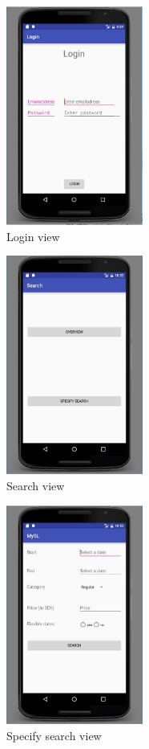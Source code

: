 \documentclass[11pt,twoside,a4paper]{report}
\begin{document}
\begin{appendices}
\begin{figure}
	\centering
	\includegraphics[width=0.4\textwidth]{png/android-login.png}
	\caption{Login view}
	\label{figure:navigation-drawer-in-start-view}
\end{figure}

\begin{figure}
	\centering
	\includegraphics[width=0.4\textwidth]{jpg/android-search.jpg}
	\caption{Search view}
	\label{figure:search-view}
\end{figure}

\begin{figure}
	\centering
	\includegraphics[width=0.4\textwidth]{jpg/android-specify-search.jpg}
	\caption{Specify search view}
	\label{figure:specify-search-view}
\end{figure}


\end{appendices}
\end{document}
